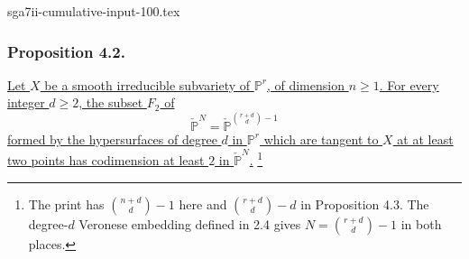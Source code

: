 \begin{filecontents*}{sga7ii-cumulative-input-100.tex}
\subsubsection*{Proposition 4.2.}
\underline{Let $X$ be a smooth irreducible subvariety of
$\mathbb P^r$, of dimension $n\geq1$.  For every integer $d\geq2$,
the subset $F_2$ of}
\[
\check{\mathbb P}^{N}
=\check{\mathbb P}^{\binom{r+d}{d}-1}
\]
\underline{formed by the hypersurfaces of degree $d$ in
$\mathbb P^r$ which are tangent to $X$ at at least two points has
codimension at least $2$ in $\check{\mathbb P}^{N}$.}
\footnote{The print has $\binom{n+d}{d}-1$ here and
$\binom{r+d}{d}-d$ in Proposition 4.3.  The degree-$d$ Veronese
embedding defined in 2.4 gives
$N=\binom{r+d}{d}-1$ in both places.}
\end{filecontents*}
